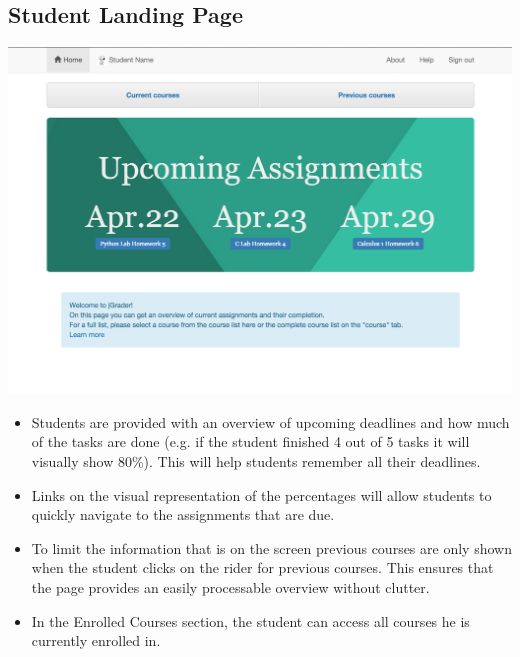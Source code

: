 \subsection{Student Landing Page}

\includegraphics[width=\textwidth]{screenshots/StudentUpcomingAssignments.png}

\begin{itemize}

\item Students are provided with an overview of upcoming deadlines and how much of the tasks are done (e.g. if the student finished 4 out of 5 tasks it will visually show 80\%). This will help students remember all their deadlines.

\item Links on the visual representation of the percentages will allow students to quickly navigate to the assignments that are due.

\item To limit the information that is on the screen previous courses are only shown when the student clicks on the rider for previous courses. This ensures that the page provides an easily processable overview without clutter.

\item In the Enrolled Courses section, the student can access all courses he is currently enrolled in.

\end{itemize}
